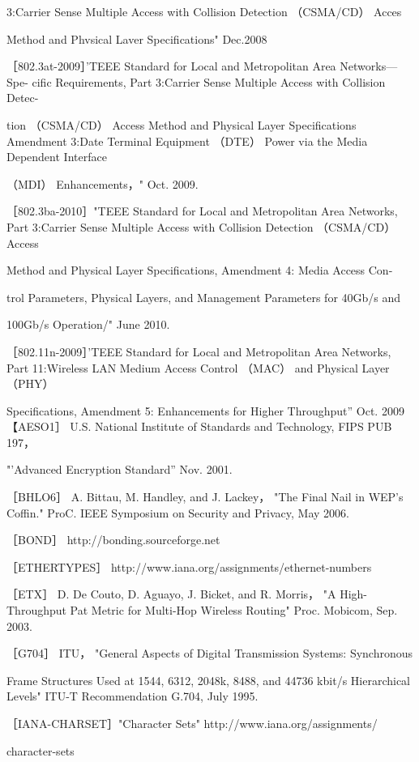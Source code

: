 3:Carrier Sense Multiple Access with Collision Detection （CSMA/CD） Acces

Method and Phvsical Laver Specifications" Dec.2008

［802.3at-2009］'TEEE Standard for Local and Metropolitan Area Networks—Spe-
cific Requirements, Part 3:Carrier Sense Multiple Access with Collision Detec-

tion （CSMA/CD） Access Method and Physical Layer Specifications Amendment
3:Date Terminal Equipment （DTE） Power via the Media Dependent Interface

（MDI） Enhancements，" Oct. 2009.

［802.3ba-2010］"TEEE Standard for Local and Metropolitan Area Networks, Part
3:Carrier Sense Multiple Access with Collision Detection （CSMA/CD） Access

Method and Physical Layer Specifications, Amendment 4: Media Access Con-

trol Parameters, Physical Layers, and Management Parameters for 40Gb/s and

100Gb/s Operation/" June 2010.

［802.11n-2009］'TEEE Standard for Local and Metropolitan Area Networks, Part
11:Wireless LAN Medium Access Control （MAC） and Physical Layer （PHY）

Specifications, Amendment 5: Enhancements for Higher Throughput” Oct. 2009
【AESO1］ U.S. National Institute of Standards and Technology, FIPS PUB 197，

"'Advanced Encryption Standard” Nov. 2001.

［BHLO6］ A. Bittau, M. Handley, and J. Lackey， "The Final Nail in WEP's Coffin."
ProC. IEEE Symposium on Security and Privacy, May 2006.

［BOND］ http://bonding.sourceforge.net

［ETHERTYPES］ http://www.iana.org/assignments/ethernet-numbers

［ETX］ D. De Couto, D. Aguayo, J. Bicket, and R. Morris， "A High-Throughput Pat
Metric for Multi-Hop Wireless Routing" Proc. Mobicom, Sep. 2003.

［G704］ ITU， "General Aspects of Digital Transmission Systems: Synchronous

Frame Structures Used at 1544, 6312, 2048k, 8488, and 44736 kbit/s Hierarchical
Levels" ITU-T Recommendation G.704, July 1995.

［IANA-CHARSET］"Character Sets" http://www.iana.org/assignments/

character-sets

